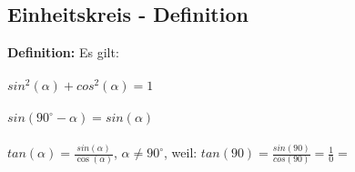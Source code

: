 \documentclass{standalone}
\begin{document}
\subsection{Einheitskreis - Definition}
\textbf{Definition:} Es gilt:
\paragraph{}
$sin^2(\alpha) + cos^2(\alpha) = 1$
\paragraph{}
$sin(90^\circ - \alpha) = sin(\alpha)$
\paragraph{}
$tan(\alpha) = \frac{sin(\alpha)}{\cos(\alpha)}$, $\alpha \neq 90^\circ$, weil:
$tan(90)=\frac{sin(90)}{cos(90)} = \frac{1}{0} = $ \Lightning
\end{document}
